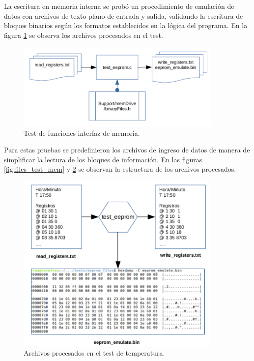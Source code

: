 La escritura en memoria interna se probó un procedimiento de emulación de datos con archivos de texto plano de entrada y salida,  validando la escritura de bloques binarios según los formatos establecidos en la lógica del programa. En la figura \ref{fig:diag_test_mem} se observa los archivos procesados en el test.
\begin{figure}[h!]
	\centering
	\includegraphics[width=0.9\textwidth]{Figures/Cap_4/diag_test_memoria}
	\caption{Test de funciones interfaz de memoria.}
	\label{fig:diag_test_mem}
\end{figure}

Para estas pruebas se predefinieron los archivos de ingreso de datos de manera de simplificar la lectura de los bloques de información. En las figuras \ref{fig:files_test_mem} y \ref{fig:files_test_temp} se observan la estructura de los archivos procesados.

\begin{figure}[h!]
	\centering
	\includegraphics[width=0.9\textwidth]{Figures/Cap_4/files_test_temperatura}
	\caption{ Archivos procesados en el test de temperatura.}
	\label{fig:files_test_temp}
\end{figure}


